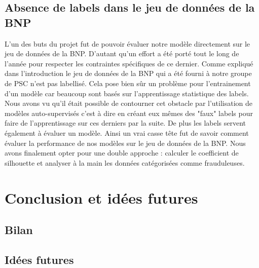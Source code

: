 \documentclass[a4paper]{article}
\begin{document}
\subsection{Absence de labels dans le jeu de données de la BNP}

L'un des buts du projet fut de pouvoir évaluer notre modèle directement sur le jeu de données de la BNP. D'autant qu'un effort a été porté tout le long de l'année pour respecter les contraintes spécifiques de ce dernier. Comme expliqué dans l'introduction le jeu de données de la BNP qui a été fourni à notre groupe de PSC n'est pas labellisé. Cela pose bien sûr un problème pour l'entrainement d'un modèle car beaucoup sont basés sur l'apprentissage statistique des labels. Nous avons vu qu'il était possible de contourner cet obstacle par l'utilisation de modèles auto-supervisés c'est à dire en créant eux mêmes des "faux" labels pour faire de l'apprentissage sur ces derniers par la suite. De plus les labels servent également à évaluer un modèle. Ainsi un vrai casse tête fut de savoir comment évaluer la performance de nos modèles sur le jeu de données de la BNP. Nous avons finalement opter pour une double approche : calculer le coefficient de silhouette et analyser à la main les données catégorisées comme frauduleuses.

\section{Conclusion et idées futures}

\subsection{Bilan}

\subsection{Idées futures}
\end{document}
